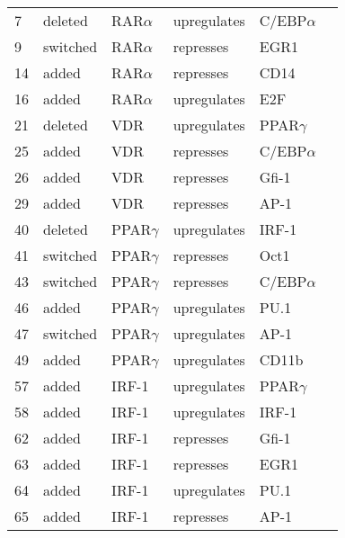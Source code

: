 

\begin{center}
\renewcommand{\arraystretch}{0.8}
\label{HL60-R38_Model}
\begin{scriptsize}
\begin{supertabular}{|p{2 cm}|p{2cm}|p{3cm}|p{2.5cm}|p{2cm}|p{1.5cm}|}  
\hline

7 &  deleted &  RAR$\alpha$  & upregulates &  C/EBP$\alpha$ & \\
9 &  switched &  RAR$\alpha$  & represses &  EGR1 & \\
14 &  added &  RAR$\alpha$  & represses &  CD14 & \\
16 &  added &  RAR$\alpha$  & upregulates &  E2F & \\
21 &  deleted &  VDR  & upregulates &  PPAR$\gamma$ & \\
25 &  added &  VDR  & represses &  C/EBP$\alpha$ & \\
26 &  added &  VDR  & represses &  Gfi-1 & \\
29 &  added &  VDR  & represses &  AP-1 & \cite{Wu2007}\\
40 &  deleted &  PPAR$\gamma$  & upregulates &  IRF-1 & \\
41 &  switched &  PPAR$\gamma$  & represses &  Oct1 & \\
43 &  switched &  PPAR$\gamma$  & represses &  C/EBP$\alpha$ & \\
46 &  added &  PPAR$\gamma$  & upregulates &  PU.1 & \\
47 &  switched &  PPAR$\gamma$  & upregulates &  AP-1 & \\
49 &  added &  PPAR$\gamma$  & upregulates &  CD11b & \\
57 &  added &  IRF-1  & upregulates &  PPAR$\gamma$ & \\
58 &  added &  IRF-1  & upregulates &  IRF-1 & \\
62 &  added &  IRF-1  & represses &  Gfi-1 & \\
63 &  added &  IRF-1  & represses &  EGR1 & \\
64 &  added &  IRF-1  & upregulates &  PU.1 & \\
65 &  added &  IRF-1  & represses &  AP-1 & \\

\end{supertabular}
\end{scriptsize}
\end{center}
